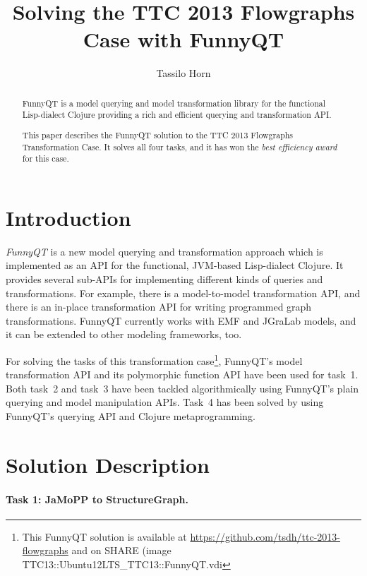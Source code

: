 \documentclass[submission]{eptcs}
\title{Solving the TTC 2013 Flowgraphs Case with FunnyQT}
\author{Tassilo Horn
  \email{horn@uni-koblenz.de}
  \institute{Institute for Software Technology, University Koblenz-Landau, Germany}}
\begin{document}
\maketitle

\begin{abstract}
  FunnyQT is a model querying and model transformation library for the
  functional Lisp-dialect Clojure providing a rich and efficient querying and
  transformation API.

  This paper describes the FunnyQT solution to the TTC 2013 Flowgraphs
  Transformation Case.  It solves all four tasks, and it has won the \emph{best
    efficiency award} for this case.
\end{abstract}

\section{Introduction}
\label{sec:introduction}

\emph{FunnyQT} is a new model querying and transformation approach which is
implemented as an API for the functional, JVM-based Lisp-dialect Clojure.  It
provides several sub-APIs for implementing different kinds of queries and
transformations.  For example, there is a model-to-model transformation API,
and there is an in-place transformation API for writing programmed graph
transformations.  FunnyQT currently works with EMF and JGraLab models, and it
can be extended to other modeling frameworks, too.

For solving the tasks of this transformation case\footnote{This FunnyQT
  solution is available at \url{https://github.com/tsdh/ttc-2013-flowgraphs}
  and on SHARE (image \textsf{TTC13::Ubuntu12LTS\_TTC13::FunnyQT.vdi}},
FunnyQT's model transformation API and its polymorphic function API have been
used for task~1.  Both task~2 and task~3 have been tackled algorithmically
using FunnyQT's plain querying and model manipulation APIs.  Task~4 has been
solved by using FunnyQT's querying API and Clojure metaprogramming.

\section{Solution Description}
\label{sec:solution-description}


\paragraph{Task 1: JaMoPP to StructureGraph.}
\label{sec:task-1}
\end{document}
